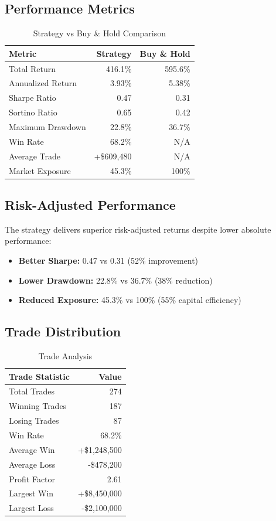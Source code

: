 \documentclass[11pt,a4paper]{article}
\begin{document}
\subsection{Performance Metrics}
\begin{table}[H]
\centering
\begin{tabular}{lrr}
\toprule
\textbf{Metric} & \textbf{Strategy} & \textbf{Buy \& Hold} \\
\midrule
Total Return & 416.1\% & 595.6\% \\
Annualized Return & 3.93\% & 5.38\% \\
Sharpe Ratio & 0.47 & 0.31 \\
Sortino Ratio & 0.65 & 0.42 \\
Maximum Drawdown & 22.8\% & 36.7\% \\
Win Rate & 68.2\% & N/A \\
Average Trade & +\$609,480 & N/A \\
Market Exposure & 45.3\% & 100\% \\
\bottomrule
\end{tabular}
\caption{Strategy vs Buy \& Hold Comparison}
\end{table}

\subsection{Risk-Adjusted Performance}
The strategy delivers superior risk-adjusted returns despite lower absolute performance:
\begin{itemize}
\item \textbf{Better Sharpe:} 0.47 vs 0.31 (52\% improvement)
\item \textbf{Lower Drawdown:} 22.8\% vs 36.7\% (38\% reduction)
\item \textbf{Reduced Exposure:} 45.3\% vs 100\% (55\% capital efficiency)
\end{itemize}

\subsection{Trade Distribution}
\begin{table}[H]
\centering
\begin{tabular}{lr}
\toprule
\textbf{Trade Statistic} & \textbf{Value} \\
\midrule
Total Trades & 274 \\
Winning Trades & 187 \\
Losing Trades & 87 \\
Win Rate & 68.2\% \\
Average Win & +\$1,248,500 \\
Average Loss & -\$478,200 \\
Profit Factor & 2.61 \\
Largest Win & +\$8,450,000 \\
Largest Loss & -\$2,100,000 \\
\bottomrule
\end{tabular}
\caption{Trade Analysis}
\end{table}
\end{document}
